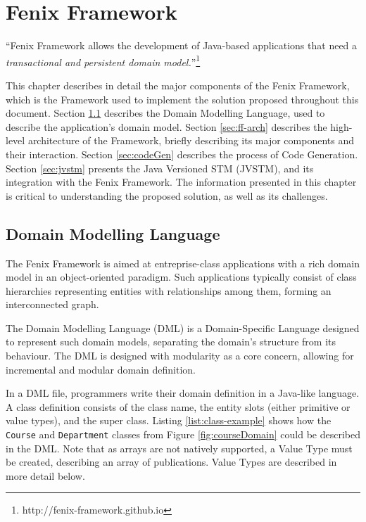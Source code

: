 \chapter{Fenix Framework}
\label{chap:ff}

``Fenix Framework allows the development of Java-based applications
that need a {\it transactional and persistent domain
  model.}''\footnote{http://fenix-framework.github.io}

This chapter describes in detail the major components of the Fenix
Framework, which is the Framework used to implement the solution
proposed throughout this document. Section \ref{sec:dml} describes the
Domain Modelling Language, used to describe the application's domain
model. Section \ref{sec:ff-arch} describes the high-level architecture
of the Framework, briefly describing its major components and their
interaction. Section \ref{sec:codeGen} describes the process of Code
Generation. Section \ref{sec:jvstm} presents the Java Versioned STM
(JVSTM), and its integration with the Fenix Framework. The information
presented in this chapter is critical to understanding the proposed
solution, as well as its challenges.

\section{Domain Modelling Language}
\label{sec:dml}

The Fenix Framework is aimed at entreprise-class applications with a
rich domain model in an object-oriented paradigm. Such applications
typically consist of class hierarchies representing entities with
relationships among them, forming an interconnected graph. 

The Domain Modelling Language (DML) is a Domain-Specific Language
designed to represent such domain models, separating the domain's
structure from its behaviour. The DML is designed with modularity as a
core concern, allowing for incremental and modular domain definition.

In a DML file, programmers write their domain definition in a
Java-like language. A class definition consists of the class name, the
entity slots (either primitive or value types), and the super
class. Listing \ref{list:class-example} shows how the \texttt{Course}
and \texttt{Department} classes from Figure \ref{fig:courseDomain}
could be described in the DML. Note that as arrays are not natively
supported, a Value Type must be created, describing an array of
publications. Value Types are described in more detail below.

